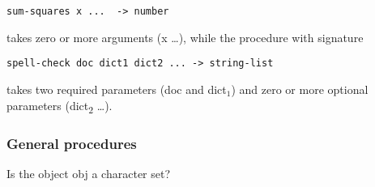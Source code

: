 \begin{verbatim}
sum-squares x ...  -> number
\end{verbatim}

takes zero or more arguments (x \ldots{}), while the procedure with
signature

\begin{verbatim}
spell-check doc dict1 dict2 ... -> string-list
\end{verbatim}

takes two required parameters (doc and dict$_1$) and zero
or more optional parameters (dict\textsubscript{2} \ldots{}).

\subsubsection{{General procedures}}\label{general-procedures}

\begin{entry}{%
  }

  Is the object obj a character set?
\end{entry}


